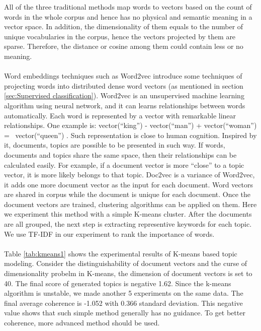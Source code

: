 All of the three traditional methods map words to vectors based on the count of words in the whole corpus and hence has no physical and semantic meaning in a vector space. In addition, the dimensionality of them equals to the number of unique vocabularies in the corpus, hence the vectors projected by them are sparse. Therefore, the distance or cosine among them could contain less or no meaning.
\\\\Word embeddings techniques such as Word2vec \cite{mikolov2013distributed,mikolov2013efficient} introduce some techniques of projecting words into distributed dense word vectors (as mentioned in section \ref{sec:Supervised classification}). Word2vec is an unsupervised machine learning algorithm using neural network, and it can learns relationships between words automatically. Each word is represented by a vector with remarkable linear relationships. One example is: vector(“king”) - vector(“man”) + vector(“woman”) =~ vector(“queen”) \cite{journals/corr/cs-CL-0205028}. Such representation is close to human cognition. Inspired by it, documents, topics are possible to be presented in such way. If words, documents and topics share the same space, then their relationships can be calculated easily. For example, if a document vector is more ``close'' to a topic vector, it is more likely belongs to that topic. Doc2vec \cite{le2014distributed} is a variance of Word2vec, it adds one more document vector as the input for each document. Word vectors are shared in corpus while the document is unique for each document. Once the document vectors are trained, clustering algorithms can be applied on them. Here we experiment this method with a simple K-means cluster. 
After the documents are all grouped, the next step is extracting representive keywords for each topic. We use TF-IDF in our experiment to rank the importance of words. 
\\\\
Table \ref{tab:kmeans1} shows the experimental results of K-means based topic modeling. Consider the distinguishability of document vectors and the curse of dimensionality probelm in K-means, the dimension of document vectors is set to 40. The final score of generated topics is negative 1.62. Since the k-means algorithm is unstable, we made another 5 experiments on the same data. The final average coherence is -1.052 with 0.366 standard deviation. This negative value shows that such simple method generally has no guidance. To get better coherence, more advanced method should be used.
